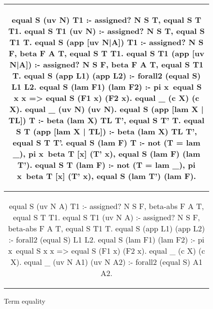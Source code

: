 \begin{figure*}
  \begin{tabular}{c}
    \begin{minipage}{.80\textwidth}
      \begin{elpicode}
        equal S (uv N) T1 :- assigned? N S T, equal S T T1.
        equal S T1 (uv N) :- assigned? N S T, equal S T1 T.
        equal S (app [uv N|A]) T1 :- assigned? N S F, beta F A T, equal S T T1.
        equal S T1 (app [uv N|A]) :- assigned? N S F, beta F A T, equal S T1 T.
        equal S (app L1) (app L2) :- forall2 (equal S) L1 L2.
        equal S (lam F1) (lam F2) :- pi x\ equal S x x => equal S (F1 x) (F2 x).
        equal _ (c X) (c X).
        equal _ (uv N) (uv N).
        equal S (app [lam X | TL]) T :- beta (lam X) TL T', equal S T' T.
        equal S T (app [lam X | TL]) :- beta (lam X) TL T', equal S T T'.
        equal S (lam F) T :- not (T = lam _),
          pi x\ beta T [x] (T' x), equal S (lam F) (lam T').
        equal S T (lam F) :- not (T = lam _),
          pi x\ beta T [x] (T' x), equal S (lam T') (lam F).
      \end{elpicode}
    \end{minipage}
    \\ \hline\hline
    \begin{minipage}{.80\textwidth}
      \begin{elpicode}
        equal S (uv N A) T1 :- assigned? N S F, beta-abs F A T, equal S T T1.
        equal S T1 (uv N A) :- assigned? N S F, beta-abs F A T, equal S T1 T.
        equal S (app L1) (app L2) :- forall2 (equal S) L1 L2.
        equal S (lam F1) (lam F2) :- pi x\ equal S x x => equal S (F1 x) (F2 x).
        equal _ (c X) (c X).
        equal _ (uv N A1) (uv N A2) :- forall2 (equal S) A1 A2. %
      \end{elpicode}
    \end{minipage}
  \end{tabular}
  \caption{Term equality}
  \label{code:term-equal}
\end{figure*}